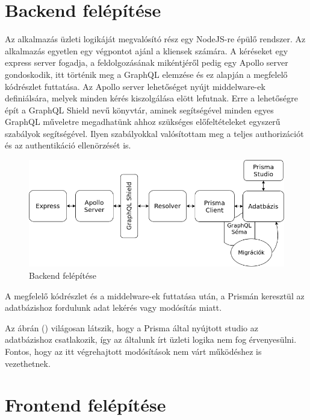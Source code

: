 \section{Backend felépítése}
Az alkalmazás üzleti logikáját megvalósító rész egy NodeJS-re épülő rendszer.
Az alkalmazás egyetlen egy végpontot ajánl a kliensek számára.
A kéréseket egy express server fogadja, a feldolgozásának mikéntjéről pedig egy Apollo server gondoskodik, itt történik meg a GraphQL elemzése és ez alapján a megfelelő kódrészlet futtatása.
Az Apollo server lehetőséget nyújt middelware-ek definiálsára, melyek minden kérés kiszolgálása elött lefutnak.
Erre a lehetőségre épít a GraphQL Shield nevű könyvtár, aminek segítségével minden egyes GraphQL műveletre megadhatünk ahhoz szükséges előfeltételeket egyszerű szabályok segítségével.
Ilyen szabályokkal valósítottam meg a teljes authorizációt és az authentikáció ellenörzését is.

\begin{figure}[!ht]
  \centering
  \includegraphics[width=150mm, keepaspectratio]{figures/backend.png}
  \caption{Backend felépítése}
  \label{fig:backend}
\end{figure}

A megfelelő kódrészlet és a middelware-ek futtatása után, a Prismán keresztül az adatbázishoz fordulunk adat lekérés vagy modósítás miatt.

Az ábrán () világosan látszik, hogy a Prisma által nyújtott studio az adatbázishoz csatlakozik, így az általunk írt üzleti logika nem fog érvenyesülni.
Fontos, hogy az itt végrehajtott modósítások nem várt működéshez is vezethetnek.


\section{Frontend felépítése}

